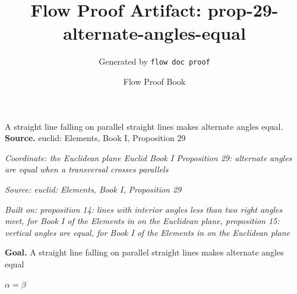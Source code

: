 \documentclass[11pt]{article}
\title{Flow Proof Artifact: prop-29-alternate-angles-equal}
\author{Generated by \texttt{flow doc proof}}
\date{Flow Proof Book}
\theoremstyle{definition}
\begin{document}
\maketitle
A straight line falling on parallel straight lines makes alternate angles equal.\\[0.5em]
\textbf{Source.} euclid: Elements, Book I, Proposition 29\\[0.5em]
\bigskip
{}\par
\smallskip\noindent\textit{Coordinate: the Euclidean plane \cdot Euclid Book I \cdot Proposition 29: alternate angles are equal when a transversal crosses parallels}\par
\smallskip\noindent\textit{Source: euclid: Elements, Book I, Proposition 29}\par
\smallskip\noindent\textit{Built on: proposition 14: lines with interior angles less than two right angles meet, for Book I of the Elements in on the Euclidean plane, proposition 15: vertical angles are equal, for Book I of the Elements in on the Euclidean plane}\par
\medskip
\noindent\textbf{Goal.} A straight line falling on parallel straight lines makes alternate angles equal\par
\noindent$\displaystyle \alpha = \beta$\par
\medskip
\noindent
\end{document}
